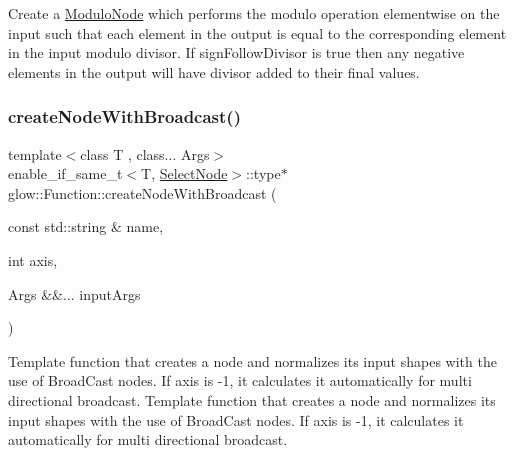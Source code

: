 Create a \hyperlink{classglow_1_1_modulo_node}{Modulo\+Node} which performs the modulo operation elementwise on the {\ttfamily input} such that each element in the output is equal to the corresponding element in the input modulo {\ttfamily divisor}. If {\ttfamily sign\+Follow\+Divisor} is true then any negative elements in the output will have divisor added to their final values. \mbox{\label{classglow_1_1_function_ad8b34304a6130cd64289773e212dba8b}} 
\subsubsection{\texorpdfstring{create\+Node\+With\+Broadcast()}{createNodeWithBroadcast()}\hspace{0.1cm}{\footnotesize\ttfamily [1/2]}}
{\footnotesize\ttfamily template$<$class T , class... Args$>$ \\
enable\+\_\+if\+\_\+same\+\_\+t$<$T, \hyperlink{classglow_1_1_select_node}{Select\+Node}$>$\+::type$\ast$ glow\+::\+Function\+::create\+Node\+With\+Broadcast (\begin{DoxyParamCaption}\item[{const std\+::string \&}]{name,  }\item[{int}]{axis,  }\item[{Args \&\&...}]{input\+Args }\end{DoxyParamCaption})\hspace{0.3cm}{\ttfamily [inline]}}

Template function that creates a node and normalizes its input shapes with the use of Broad\+Cast nodes. If axis is -\/1, it calculates it automatically for multi directional broadcast. Template function that creates a node and normalizes its input shapes with the use of Broad\+Cast nodes. If axis is -\/1, it calculates it automatically for multi directional broadcast. \mbox{\label{classglow_1_1_function_a6b3c2945ca9381bc22dc01559dcdbbe9}} 
